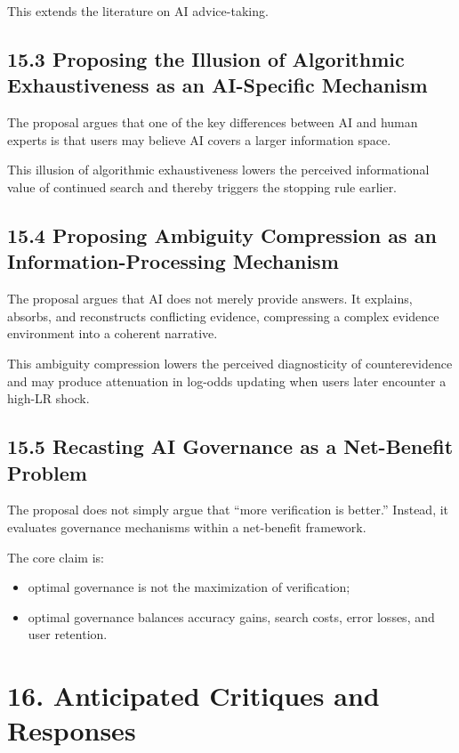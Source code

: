 This extends the literature on AI advice-taking.

\subsection*{15.3 Proposing the Illusion of Algorithmic Exhaustiveness as an AI-Specific Mechanism}

The proposal argues that one of the key differences between AI and human experts is that users may believe AI covers a larger information space.

This illusion of algorithmic exhaustiveness lowers the perceived informational value of continued search and thereby triggers the stopping rule earlier.

\subsection*{15.4 Proposing Ambiguity Compression as an Information-Processing Mechanism}

The proposal argues that AI does not merely provide answers. It explains, absorbs, and reconstructs conflicting evidence, compressing a complex evidence environment into a coherent narrative.

This ambiguity compression lowers the perceived diagnosticity of counterevidence and may produce attenuation in log-odds updating when users later encounter a high-LR shock.

\subsection*{15.5 Recasting AI Governance as a Net-Benefit Problem}

The proposal does not simply argue that ``more verification is better.'' Instead, it evaluates governance mechanisms within a net-benefit framework.

The core claim is:
\begin{itemize}[leftmargin=1.5em]
\item optimal governance is not the maximization of verification;
\item optimal governance balances accuracy gains, search costs, error losses, and user retention.
\end{itemize}

\section*{16. Anticipated Critiques and Responses}

